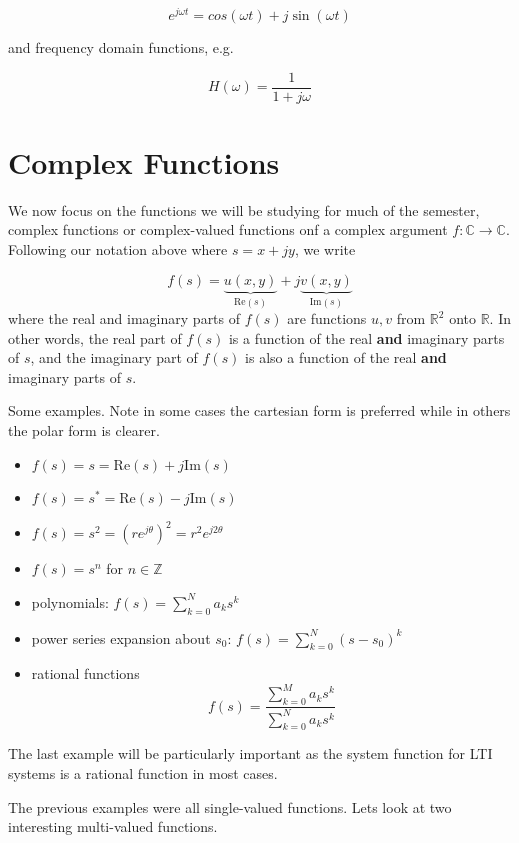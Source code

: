 \documentclass{article}
\begin{document}
\[
e^{j\omega t} = cos(\omega t) + j\sin(\omega t)
\]

and frequency domain functions, e.g.

\[
H(\omega) = \frac{1}{1+j\omega}
\]

\section{Complex Functions}

We now focus on the functions we will be studying for much of the semester, complex functions or complex-valued functions onf a complex argument $f: \mathbb{C} \rightarrow \mathbb{C}$. Following our notation above where $s = x + jy$, we write

\[
f(s) = \underbrace{u(x,y)}_{\text{Re}(s)} + j \underbrace{v(x,y)}_{\text{Im}(s)}
\]
where the real and imaginary parts of $f(s)$ are functions $u,v$ from $\mathbb{R}^2$ onto $\mathbb{R}$. In other words, the real part of $f(s)$ is a function of the real \textbf{and} imaginary parts of $s$, and the imaginary part of $f(s)$ is also a function of the real \textbf{and} imaginary parts of $s$.

Some examples. Note in some cases the cartesian form is preferred while in others the polar form is clearer.

\begin{itemize}
\item $f(s) = s = \text{Re}(s) + j\text{Im}(s)$
\item $f(s) = s^* = \text{Re}(s) - j\text{Im}(s)$
\item $f(s) = s^2 = \left(re^{j\theta}\right)^2 = r^2 e^{j2\theta}$
\item $f(s) = s^n$ for $n\in\mathbb{Z}$
\item polynomials: $f(s) = \sum\limits_{k = 0}^N a_ks^k$
\item power series expansion about $s_0$: $f(s) = \sum\limits_{k = 0}^N (s-s_0)^k$
\item rational functions
  \[
  f(s) = \frac{\sum\limits_{k = 0}^M a_ks^k}{\sum\limits_{k = 0}^N a_ks^k}
  \]
\end{itemize}

The last example will be particularly important as the system function for LTI systems is a rational function in most cases.

The previous examples were all single-valued functions. Lets look at two interesting multi-valued functions.
\end{document}

